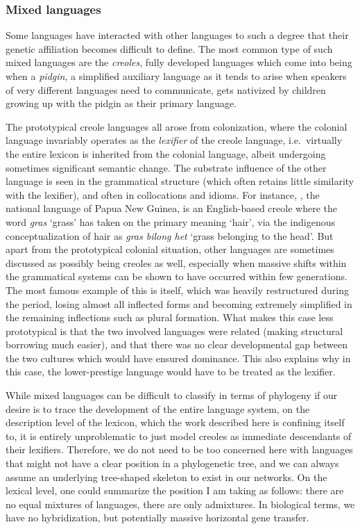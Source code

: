 \subsubsection{Mixed languages}
Some languages have interacted with other languages to such a degree that their genetic affiliation becomes difficult to define. The most common type of such mixed languages are the \textit{creoles}, fully developed languages which come into being when a \textit{pidgin}, a simplified auxiliary language as it tends to arise when speakers of very different languages need to communicate, gets nativized by children growing up with the pidgin as their primary language.

The prototypical creole languages all arose from colonization, where the colonial language invariably operates as the \textit{lexifier} of the creole language, i.e.\ virtually the entire lexicon is inherited from the colonial language, albeit undergoing sometimes significant semantic change. The substrate influence of the other language is seen in the grammatical structure (which often retains little similarity with the lexifier), and often in collocations and idioms. For instance, , the national language of Papua New Guinea, is an English-based creole where the word \textit{gras} `grass' has taken on the primary meaning `hair', via the indigenous conceptualization of hair as \textit{gras bilong het} `grass belonging to the head'. But apart from the prototypical colonial situation, other languages are sometimes discussed as possibly being creoles as well, especially when massive shifts within the grammatical systems can be shown to have occurred within few generations. The most famous example 
of this is  itself, which was heavily restructured during the  period, losing almost all inflected forms and becoming extremely simplified in the remaining inflections such as plural formation. What makes this case less prototypical is that the two involved languages were related (making structural borrowing much easier), and that there was no clear developmental gap between the two cultures which would have ensured dominance. This also explains why in this case, the lower-prestige language would have to be treated as the lexifier.

While mixed languages can be difficult to classify in terms of phylogeny if our desire is to trace the development of the entire language system, on the description level of the lexicon, which the work described here is confining itself to, it is entirely unproblematic to just model creoles as immediate descendants of their lexifiers. Therefore, we do not need to be too concerned here with languages that might not have a clear position in a phylogenetic tree, and we can always assume an underlying tree-shaped skeleton to exist in our networks. On the lexical level, one could summarize the position I am taking as follows: there are no equal mixtures of languages, there are only admixtures. In biological terms, we have no hybridization, but potentially massive horizontal gene transfer.

